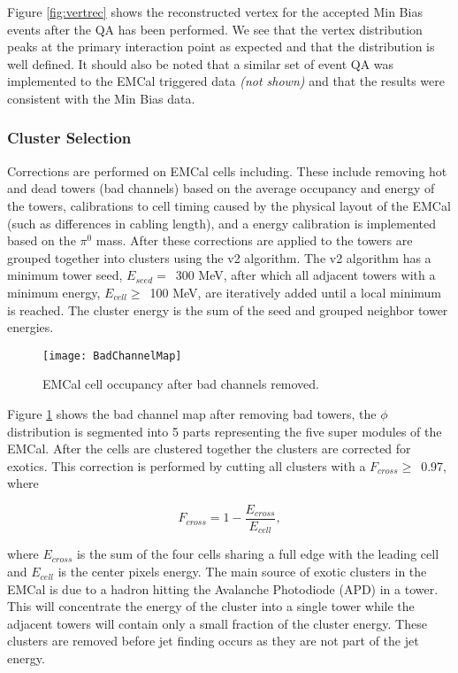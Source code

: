 \noindent 
Figure \ref{fig:vertrec} shows the reconstructed vertex for the accepted Min Bias events after the QA has been performed.  We see that the vertex distribution peaks at the primary interaction point as expected and that the distribution is well defined.  It should also be noted that a similar set of event QA was implemented to the EMCal triggered data \textit{(not shown)} and that the results were consistent with the Min Bias data.

\subsubsection{Cluster Selection}
Corrections are performed on EMCal cells including.  These include removing hot and dead towers (bad channels) based on the average occupancy and energy of the towers, calibrations to cell timing caused by the physical layout of the EMCal (such as differences in cabling length), and a energy calibration is implemented based on the $\pi^{0}$ mass.  After these corrections are applied to the towers are grouped together into clusters using the v2 algorithm.  The v2 algorithm has a minimum tower seed, $E_{seed} = \,$ 300 MeV, after which all adjacent towers with a minimum energy, $E_{cell} \geq \,$ 100 MeV, are iteratively added until a local minimum is reached.  The cluster energy is the sum of the seed and grouped neighbor tower energies.   

\begin{figure}[h]
\texttt{[image: BadChannelMap]}
\centering
\caption{EMCal cell occupancy after bad channels removed.}
\label{fig:badchannel}
\end{figure}


\noindent
Figure \ref{fig:badchannel} shows the bad channel map after removing bad towers, the $\phi$ distribution is segmented into 5 parts representing the five super modules of the EMCal.  After the cells are clustered together the clusters are corrected for exotics.  This correction is performed by cutting all clusters with a $F_{cross} \geq \,$ 0.97, where

\begin{equation}
F_{cross} = 1 - \frac{ E_{cross} }{ E_{cell} },
\label{eq:Fcross}
\end{equation}

\noindent
where $E_{cross}$ is the sum of the four cells sharing a full edge with the leading cell and $E_{cell}$ is the center pixels energy.  The main source of exotic clusters in the EMCal is due to a hadron hitting the Avalanche Photodiode (APD) in a tower.  This will concentrate the energy of the cluster into a single tower while the adjacent towers will contain only a small fraction of the cluster energy.  These clusters are removed before jet finding occurs as they are not part of the jet energy.

